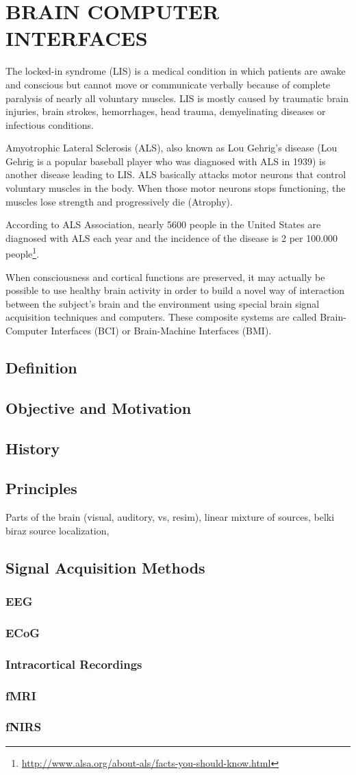 \documentclass[12pt]{article}
\newcommand\mysection[1]{\vspace*{-0.35cm}\section{#1}\vspace*{6pt}\thispagestyle{empty}}
\newcommand\mysubsection[1]{\subsection{#1}}
\newcommand\mysubsubsection[1]{\subsubsection{#1}}
\numberwithin{equation}{section}
\numberwithin{figure}{section}
\numberwithin{table}{section}
\begin{document}
\mysection{BRAIN COMPUTER INTERFACES}\label{seq:bci}

\par{
    The locked-in syndrome (LIS) is a medical condition in which patients are awake and conscious but 
    cannot move or communicate verbally because of complete paralysis of nearly all voluntary muscles. 
    LIS is mostly caused by traumatic brain injuries, brain strokes, hemorrhages, head trauma, demyelinating diseases 
    or infectious conditions.
}


\par {
    Amyotrophic Lateral Sclerosis (ALS), also known as Lou Gehrig's disease (Lou Gehrig is a popular baseball 
    player who was diagnosed with ALS in 1939) is another disease leading to LIS. ALS basically attacks 
    motor neurons that control voluntary muscles in the body. When those motor neurons stops functioning, 
    the muscles lose strength and progressively die (Atrophy).
}

\par {
    According to ALS Association, nearly 5600 people in the United States are 
    diagnosed with ALS each year and the incidence of the disease is 2 per 100.000 
    people\footnote{\url{http://www.alsa.org/about-als/facts-you-should-know.html}}.
}

\par{
    When consciousness and cortical functions are preserved, it may actually be 
    possible to use healthy brain activity in order to build a novel way of interaction 
    between the subject's brain and the environment using special brain signal 
    acquisition techniques and computers. These composite systems are called 
    Brain-Computer Interfaces (BCI) or Brain-Machine Interfaces (BMI).
}

\mysubsection{Definition}\label{seq:bci_definition}
\mysubsection{Objective and Motivation}\label{seq:bci_motivation}
\mysubsection{History}\label{seq:bci_history}
\mysubsection{Principles}\label{seq:bci_principles}
\par{
Parts of the brain (visual, auditory, vs, resim), linear mixture of sources, belki biraz source localization, 
}

\mysubsection{Signal Acquisition Methods}\label{seq:bci_methods}
\mysubsubsection{EEG}\label{seq:bci_methods_eeg}
\mysubsubsection{ECoG}\label{seq:bci_methods_ecog}
\mysubsubsection{Intracortical Recordings}\label{seq:bci_methods_intracortical}
\mysubsubsection{fMRI}\label{seq:bci_methods_fmri}
\mysubsubsection{fNIRS}\label{seq:bci_methods_fnirs}
\end{document}
